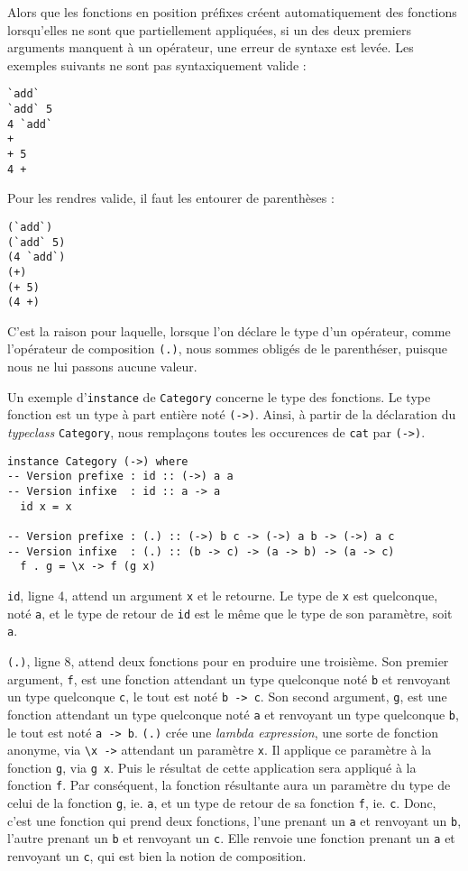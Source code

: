 \documentclass{llncs}
\begin{document}
Alors que les fonctions en position préfixes créent automatiquement des fonctions
lorsqu'elles ne sont que partiellement appliquées, si un des deux premiers arguments
manquent à un opérateur, une erreur de syntaxe est levée.
Les exemples suivants ne sont pas syntaxiquement valide :
\begin{lstlisting}
`add`
`add` 5
4 `add`
+
+ 5
4 +
\end{lstlisting}

Pour les rendres valide, il faut les entourer de parenthèses :
\begin{lstlisting}
(`add`)
(`add` 5)
(4 `add`)
(+)
(+ 5)
(4 +)
\end{lstlisting}

C'est la raison pour laquelle, lorsque l'on déclare le type d'un opérateur, comme
l'opérateur de composition \lstinline{(.)}, nous sommes obligés de le parenthéser,
puisque nous ne lui passons aucune valeur.

Un exemple d'\lstinline{instance} de \lstinline{Category} concerne le type des fonctions.
Le type fonction est un type à part entière noté \lstinline{(->)}.
Ainsi, à partir de la déclaration du \emph{typeclass} \lstinline{Category}, nous
remplaçons toutes les occurences de \lstinline{cat} par \lstinline{(->)}.
\begin{lstlisting}
instance Category (->) where
-- Version prefixe : id :: (->) a a
-- Version infixe  : id :: a -> a
  id x = x

-- Version prefixe : (.) :: (->) b c -> (->) a b -> (->) a c
-- Version infixe  : (.) :: (b -> c) -> (a -> b) -> (a -> c)
  f . g = \x -> f (g x)
\end{lstlisting}

\lstinline{id}, ligne 4, attend un argument \lstinline{x} et le retourne.
Le type de \lstinline{x} est quelconque, noté \lstinline{a}, et le type de retour
de \lstinline{id} est le même que le type de son paramètre, soit \lstinline{a}.

\lstinline{(.)}, ligne 8, attend deux fonctions pour en produire une troisième.
Son premier argument, \lstinline{f}, est une fonction attendant un type quelconque
noté \lstinline{b} et renvoyant un type quelconque \lstinline{c}, le tout est
noté \lstinline{b -> c}.
Son second argument, \lstinline{g}, est une fonction attendant un type quelconque
noté \lstinline{a} et renvoyant un type quelconque \lstinline{b}, le tout est
noté \lstinline{a -> b}.
\lstinline{(.)} crée une \emph{lambda expression}, une sorte de fonction anonyme,
via \lstinline{\x ->} attendant un paramètre \lstinline{x}.
Il applique ce paramètre à la fonction \lstinline{g}, via \lstinline{g x}.
Puis le résultat de cette application sera appliqué à la fonction \lstinline{f}.
Par conséquent, la fonction résultante aura un paramètre du type de celui de la
fonction \lstinline{g}, ie. \lstinline{a}, et un type de retour de sa fonction \lstinline{f},
ie. \lstinline{c}.
Donc, c'est une fonction qui prend deux fonctions, l'une prenant un \lstinline{a}
et renvoyant un \lstinline{b}, l'autre prenant un \lstinline{b} et renvoyant un \lstinline{c}.
Elle renvoie une fonction prenant un \lstinline{a} et renvoyant un \lstinline{c},
qui est bien la notion de composition.
\end{document}
